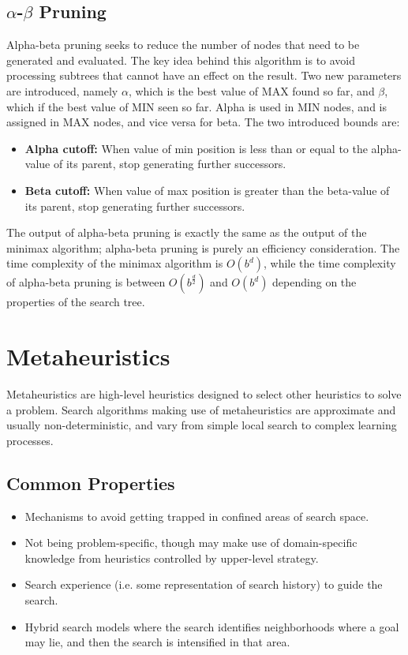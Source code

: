 \documentclass[12pt,titlepage]{article}
\let\stdsection\section
\renewcommand\section{\clearpage\stdsection}
\begin{document}
    \subsection{$\alpha$-$\beta$ Pruning}
      Alpha-beta pruning seeks to reduce the number of nodes that need to be generated and evaluated. The key idea behind this algorithm is to avoid
      processing subtrees that cannot have an effect on the result. Two new parameters are introduced, namely $\alpha$, which is the best value of MAX
      found so far, and $\beta$, which if the best value of MIN seen so far. Alpha is used in MIN nodes, and is assigned in MAX nodes, and vice versa for
      beta. The two introduced bounds are:
      \begin{itemize}
        \item \textbf{Alpha cutoff:} When value of min position is less than or equal to the alpha-value of its parent, stop generating further successors.
        \item \textbf{Beta cutoff:} When value of max position is greater than the beta-value of its parent, stop generating further successors.
      \end{itemize}

      The output of alpha-beta pruning is exactly the same as the output of the minimax algorithm; alpha-beta pruning is purely an efficiency consideration.
      The time complexity of the minimax algorithm is $O(b^d)$, while the time complexity of alpha-beta pruning is between $O(b^\frac{d}{2})$ and $O(b^d)$
      depending on the properties of the search tree.

  \section{Metaheuristics}
    Metaheuristics are high-level heuristics designed to select other heuristics to solve a problem. Search algorithms making use of metaheuristics are approximate
    and usually non-deterministic, and vary from simple local search to complex learning processes.

    \subsection{Common Properties}
      \begin{itemize}
        \item Mechanisms to avoid getting trapped in confined areas of search space.
        \item Not being problem-specific, though may make use of domain-specific knowledge from heuristics controlled by upper-level strategy.
        \item Search experience (i.e. some representation of search history) to guide the search.
        \item Hybrid search models where the search identifies neighborhoods where a goal may lie, and then the search is intensified in that area.
      \end{itemize}
\end{document}
